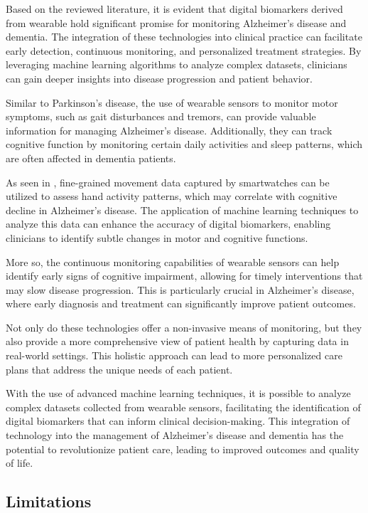 \documentclass[sigconf,nonacm]{acmart}
\begin{document}
    Based on the reviewed literature, it is evident that digital biomarkers derived from wearable hold significant promise for monitoring Alzheimer's disease and dementia. The integration of these technologies into clinical practice can facilitate early detection, continuous monitoring, and personalized treatment strategies. By leveraging machine learning algorithms to analyze complex datasets, clinicians can gain deeper insights into disease progression and patient behavior.

    Similar to Parkinson's disease, the use of wearable sensors to monitor motor symptoms, such as gait disturbances and tremors, can provide valuable information for managing Alzheimer's disease. Additionally, they can track cognitive function by monitoring certain daily activities and sleep patterns, which are often affected in dementia patients.

    As seen in \cite{sensing-fine-grained-2019}, fine-grained movement data captured by smartwatches can be utilized to assess hand activity patterns, which may correlate with cognitive decline in Alzheimer's disease. The application of machine learning techniques to analyze this data can enhance the accuracy of digital biomarkers, enabling clinicians to identify subtle changes in motor and cognitive functions.

    More so, the continuous monitoring capabilities of wearable sensors can help identify early signs of cognitive impairment, allowing for timely interventions that may slow disease progression. This is particularly crucial in Alzheimer's disease, where early diagnosis and treatment can significantly improve patient outcomes.

    Not only do these technologies offer a non-invasive means of monitoring, but they also provide a more comprehensive view of patient health by capturing data in real-world settings. This holistic approach can lead to more personalized care plans that address the unique needs of each patient.

    With the use of advanced machine learning techniques, it is possible to analyze complex datasets collected from wearable sensors, facilitating the identification of digital biomarkers that can inform clinical decision-making. This integration of technology into the management of Alzheimer's disease and dementia has the potential to revolutionize patient care, leading to improved outcomes and quality of life.

\subsection{Limitations}
\end{document}
